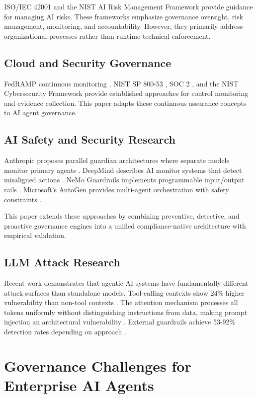 \documentclass[conference]{IEEEtran}
\begin{document}
ISO/IEC 42001 \cite{b2} and the NIST AI Risk Management Framework \cite{b1} provide guidance for managing AI risks. These frameworks emphasize governance oversight, risk management, monitoring, and accountability. However, they primarily address organizational processes rather than runtime technical enforcement.

\subsection{Cloud and Security Governance}

FedRAMP continuous monitoring \cite{b3}, NIST SP 800-53 \cite{b4}, SOC 2 \cite{b5}, and the NIST Cybersecurity Framework \cite{b6} provide established approaches for control monitoring and evidence collection. This paper adapts these continuous assurance concepts to AI agent governance.

\subsection{AI Safety and Security Research}

Anthropic proposes parallel guardian architectures where separate models monitor primary agents \cite{b16}. DeepMind describes AI monitor systems that detect misaligned actions \cite{b17}. NeMo Guardrails implements programmable input/output rails \cite{b18}. Microsoft's AutoGen provides multi-agent orchestration with safety constraints \cite{b19}.

This paper extends these approaches by combining preventive, detective, and proactive governance engines into a unified compliance-native architecture with empirical validation.

\subsection{LLM Attack Research}

Recent work demonstrates that agentic AI systems have fundamentally different attack surfaces than standalone models. Tool-calling contexts show 24\% higher vulnerability than non-tool contexts \cite{b20}. The attention mechanism processes all tokens uniformly without distinguishing instructions from data, making prompt injection an architectural vulnerability \cite{b21}. External guardrails achieve 53-92\% detection rates depending on approach \cite{b22}.

\section{Governance Challenges for Enterprise AI Agents}
\end{document}
